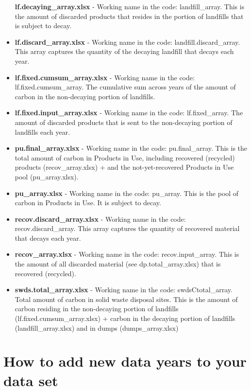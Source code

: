 \documentclass[
  openany]{book}
\begin{document}
\begin{itemize}
  \textbf{lf.decaying\_array.xlsx} - Working name in the code: landfill\_array. This is the amount of discarded products that resides in the portion of landfills that is subject to decay.
\item
  \textbf{lf.discard\_array.xlsx} - Working name in the code: landfill.discard\_array. This array captures the quantity of the decaying landfill that decays each year.
\item
  \textbf{lf.fixed.cumsum\_array.xlsx} - Working name in the code: lf.fixed.cumsum\_array. The cumulative sum across years of the amount of carbon in the non-decaying portion of landfills.
\item
  \textbf{lf.fixed.input\_array.xlsx} - Working name in the code: lf.fixed\_array. The amount of discarded products that is sent to the non-decaying portion of landfills each year.
\item
  \textbf{pu.final\_array.xlsx} - Working name in the code: pu.final\_array. This is the total amount of carbon in Products in Use, including recovered (recycled) products (recov\_array.xlsx) + and the not-yet-recovered Products in Use pool (pu\_array.xlsx).
\item
  \textbf{pu\_array.xlsx} - Working name in the code: pu\_array. This is the pool of carbon in Products in Use. It is subject to decay.
\item
  \textbf{recov.discard\_array.xlsx} - Working name in the code: recov.discard\_array. This array captures the quantity of recovered material that decays each year.
\item
  \textbf{recov\_array.xlsx} - Working name in the code: recov.input\_array. This is the amount of all discarded material (see dp.total\_array.xlsx) that is recovered (recycled).
\item
  \textbf{swds.total\_array.xlsx} - Working name in the code: swdsCtotal\_array. Total amount of carbon in solid waste disposal sites. This is the amount of carbon residing in the non-decaying portion of landfills (lf.fixed.cumsum\_array.xlsx) + carbon in the decaying portion of landfills (landfill\_array.xlsx) and in dumps (dumps\_array.xlsx)
\end{itemize}

\hypertarget{dnld-add}{%
\section{How to add new data years to your data set}\label{dnld-add}}
\end{document}
